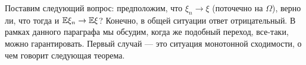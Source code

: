 Поставим следующий вопрос: предположим, что $\xi_n \to \xi$ (поточечно на $\Omega$), верно ли, что тогда и $\mathbb{E} \xi_n \to \mathbb{E} \xi$? Конечно, в общей ситуации ответ отрицательный. В рамках данного параграфа мы обсудим, когда же подобный переход, все-таки, можно гарантировать. Первый случай — это ситуация монотонной сходимости, о чем говорит следующая теорема.


